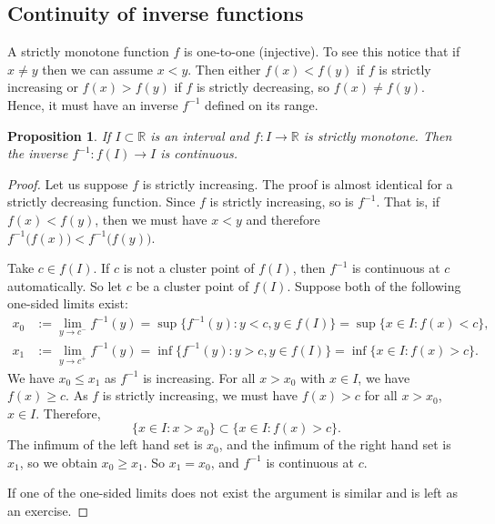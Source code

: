 \documentclass[12pt]{book}
\newcommand{\R}{{\mathbb{R}}}
\theoremstyle{plain}
\newtheorem{prop}[thm]{Proposition}
\theoremstyle{remark}
\theoremstyle{definition}
\theoremstyle{exercise}
\theoremstyle{example}
\begin{document}
\subsection{Continuity of inverse functions}


A strictly monotone function $f$ is one-to-one (injective).  To see this
notice that if $x \not= y$ then we can assume $x < y$.  Then either $f(x) <
f(y)$ if $f$ is strictly increasing or $f(x) > f(y)$ if $f$ is strictly
decreasing, so $f(x) \not= f(y)$.
Hence, it
must have an inverse $f^{-1}$ defined on its range.

\begin{prop} \label{prop:invcont}
If $I \subset \R$ is an interval and $f \colon I \to \R$ is strictly
monotone.  Then the inverse $f^{-1} \colon f(I) \to I$ is continuous.
\end{prop}

\begin{proof}
Let us suppose $f$ is strictly increasing.  The proof is almost
identical for a strictly decreasing function.
Since $f$ is strictly increasing, so is $f^{-1}$.  That is, if $f(x) <
f(y)$, then we must have $x < y$ and therefore
$f^{-1}\bigl(f(x)\bigr) < f^{-1}\bigl(f(y)\bigr)$.

Take $c \in f(I)$.
If $c$ is not a cluster point of $f(I)$, then $f^{-1}$ is continuous at $c$
automatically.  So let $c$ be a cluster point of $f(I)$.
Suppose both of the following one-sided limits exist:
\begin{align*}
x_0 & := \lim_{y \to c^-} f^{-1}(y) =
\sup \{ f^{-1}(y) : y < c, y \in f(I) \}
=
\sup \{ x \in I : f(x) < c \} , \\
x_1 & := \lim_{y \to c^+} f^{-1}(y) =
\inf \{ f^{-1}(y) : y > c, y \in f(I) \}
=
\inf \{ x \in I : f(x) > c \} .
\end{align*}
We have $x_0 \leq x_1$ as $f^{-1}$ is increasing.
For all $x > x_0$ with $x \in I$, we have $f(x) \geq c$.  As $f$ is strictly increasing,
we must have $f(x) > c$ for all $x > x_0$, $x \in I$.  Therefore,
\begin{equation*}
\{ x \in I : x > x_0 \} \subset \{ x \in I : f(x) > c \}.
\end{equation*}
The infimum of the left hand set is $x_0$, and the infimum of the right hand
set is $x_1$, so we obtain $x_0 \geq x_1$.
So $x_1 = x_0$, and $f^{-1}$ is continuous at $c$.

If one of the one-sided limits does not exist the argument is similar
and is left as an exercise.
\end{proof}
\end{document}
